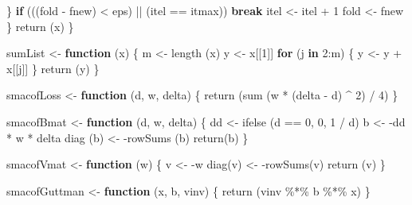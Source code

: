 \documentclass[
  12pt,
  letterpaper,
  DIV=11,
  numbers=noendperiod]{scrreprt}
\newenvironment{Shaded}{\begin{snugshade}}{\end{snugshade}}
\newcommand{\ControlFlowTok}[1]{\textcolor[rgb]{0.00,0.23,0.31}{\textbf{#1}}}
\newcommand{\DecValTok}[1]{\textcolor[rgb]{0.68,0.00,0.00}{#1}}
\newcommand{\FunctionTok}[1]{\textcolor[rgb]{0.28,0.35,0.67}{#1}}
\newcommand{\NormalTok}[1]{\textcolor[rgb]{0.00,0.23,0.31}{#1}}
\newcommand{\OtherTok}[1]{\textcolor[rgb]{0.00,0.23,0.31}{#1}}
\newcommand{\SpecialCharTok}[1]{\textcolor[rgb]{0.37,0.37,0.37}{#1}}
\theoremstyle{remark}
\begin{document}
\begin{Shaded}
\begin{Highlighting}[]
\NormalTok{    \}}
    \ControlFlowTok{if}\NormalTok{ (((fold }\SpecialCharTok{{-}}\NormalTok{ fnew) }\SpecialCharTok{\textless{}}\NormalTok{ eps) }\SpecialCharTok{||}\NormalTok{ (itel }\SpecialCharTok{==}\NormalTok{ itmax))}
      \ControlFlowTok{break}
\NormalTok{    itel }\OtherTok{\textless{}{-}}\NormalTok{ itel }\SpecialCharTok{+} \DecValTok{1}
\NormalTok{    fold }\OtherTok{\textless{}{-}}\NormalTok{ fnew}
\NormalTok{  \}}
  \FunctionTok{return}\NormalTok{ (x)}
\NormalTok{\}}

\NormalTok{sumList }\OtherTok{\textless{}{-}} \ControlFlowTok{function}\NormalTok{ (x) \{}
\NormalTok{  m }\OtherTok{\textless{}{-}} \FunctionTok{length}\NormalTok{ (x)}
\NormalTok{  y }\OtherTok{\textless{}{-}}\NormalTok{ x[[}\DecValTok{1}\NormalTok{]]}
  \ControlFlowTok{for}\NormalTok{ (j }\ControlFlowTok{in} \DecValTok{2}\SpecialCharTok{:}\NormalTok{m) \{}
\NormalTok{    y }\OtherTok{\textless{}{-}}\NormalTok{ y }\SpecialCharTok{+}\NormalTok{ x[[j]]}
\NormalTok{  \}}
  \FunctionTok{return}\NormalTok{ (y)}
\NormalTok{\}}


\NormalTok{smacofLoss }\OtherTok{\textless{}{-}} \ControlFlowTok{function}\NormalTok{ (d, w, delta) \{}
  \FunctionTok{return}\NormalTok{ (}\FunctionTok{sum}\NormalTok{ (w }\SpecialCharTok{*}\NormalTok{ (delta }\SpecialCharTok{{-}}\NormalTok{ d) }\SpecialCharTok{\^{}} \DecValTok{2}\NormalTok{) }\SpecialCharTok{/} \DecValTok{4}\NormalTok{)}
\NormalTok{\}}

\NormalTok{smacofBmat }\OtherTok{\textless{}{-}} \ControlFlowTok{function}\NormalTok{ (d, w, delta) \{}
\NormalTok{  dd }\OtherTok{\textless{}{-}} \FunctionTok{ifelse}\NormalTok{ (d }\SpecialCharTok{==} \DecValTok{0}\NormalTok{, }\DecValTok{0}\NormalTok{, }\DecValTok{1} \SpecialCharTok{/}\NormalTok{ d)}
\NormalTok{  b }\OtherTok{\textless{}{-}} \SpecialCharTok{{-}}\NormalTok{dd }\SpecialCharTok{*}\NormalTok{ w }\SpecialCharTok{*}\NormalTok{ delta}
  \FunctionTok{diag}\NormalTok{ (b) }\OtherTok{\textless{}{-}} \SpecialCharTok{{-}}\FunctionTok{rowSums}\NormalTok{ (b)}
  \FunctionTok{return}\NormalTok{(b)}
\NormalTok{\}}

\NormalTok{smacofVmat }\OtherTok{\textless{}{-}} \ControlFlowTok{function}\NormalTok{ (w) \{}
\NormalTok{  v }\OtherTok{\textless{}{-}} \SpecialCharTok{{-}}\NormalTok{w}
  \FunctionTok{diag}\NormalTok{(v) }\OtherTok{\textless{}{-}} \SpecialCharTok{{-}}\FunctionTok{rowSums}\NormalTok{(v)}
  \FunctionTok{return}\NormalTok{ (v)}
\NormalTok{\}}

\NormalTok{smacofGuttman }\OtherTok{\textless{}{-}} \ControlFlowTok{function}\NormalTok{ (x, b, vinv) \{}
  \FunctionTok{return}\NormalTok{ (vinv }\SpecialCharTok{\%*\%}\NormalTok{ b }\SpecialCharTok{\%*\%}\NormalTok{ x)}
\NormalTok{\}}


\end{Highlighting}
\end{Shaded}
\end{document}
